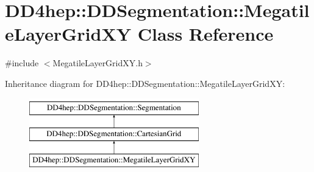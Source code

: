 \hypertarget{class_d_d4hep_1_1_d_d_segmentation_1_1_megatile_layer_grid_x_y}{}\section{D\+D4hep\+:\+:D\+D\+Segmentation\+:\+:Megatile\+Layer\+Grid\+XY Class Reference}
\label{class_d_d4hep_1_1_d_d_segmentation_1_1_megatile_layer_grid_x_y}


{\ttfamily \#include $<$Megatile\+Layer\+Grid\+X\+Y.\+h$>$}

Inheritance diagram for D\+D4hep\+:\+:D\+D\+Segmentation\+:\+:Megatile\+Layer\+Grid\+XY\+:\begin{figure}[H]
\begin{center}
\leavevmode
\includegraphics[height=3.000000cm]{class_d_d4hep_1_1_d_d_segmentation_1_1_megatile_layer_grid_x_y}
\end{center}
\end{figure}
